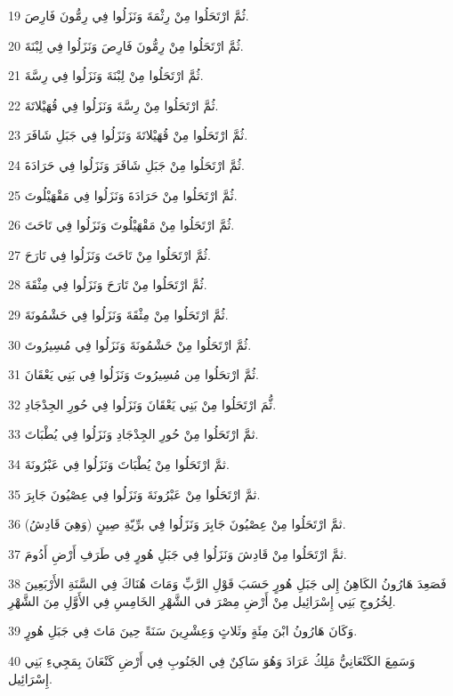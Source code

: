 \par 19 ثُمَّ ارْتَحَلُوا مِنْ رِثْمَةَ وَنَزَلُوا فِي رِمُّونَ فَارِصَ.
\par 20 ثُمَّ ارْتَحَلُوا مِنْ رِمُّونَ فَارِصَ وَنَزَلُوا فِي لِبْنَةَ.
\par 21 ثُمَّ ارْتَحَلُوا مِنْ لِبْنَةَ وَنَزَلُوا فِي رِسَّةَ.
\par 22 ثُمَّ ارْتَحَلُوا مِنْ رِسَّةَ وَنَزَلُوا فِي قُهَيْلاتَةَ.
\par 23 ثُمَّ ارْتَحَلُوا مِنْ قُهَيْلاتَةَ وَنَزَلُوا فِي جَبَلِ شَافَرَ.
\par 24 ثُمَّ ارْتَحَلُوا مِنْ جَبَلِ شَافَرَ وَنَزَلُوا فِي حَرَادَةَ.
\par 25 ثُمَّ ارْتَحَلُوا مِنْ حَرَادَةَ وَنَزَلُوا فِي مَقْهَيْلُوتَ.
\par 26 ثُمَّ ارْتَحَلُوا مِنْ مَقْهَيْلُوتَ وَنَزَلُوا فِي تَاحَتَ.
\par 27 ثُمَّ ارْتَحَلُوا مِنْ تَاحَتَ وَنَزَلُوا فِي تَارَحَ.
\par 28 ثُمَّ ارْتَحَلُوا مِنْ تَارَحَ وَنَزَلُوا فِي مِثْقَةَ.
\par 29 ثُمَّ ارْتَحَلُوا مِنْ مِثْقَةَ وَنَزَلُوا فِي حَشْمُونَةَ.
\par 30 ثُمَّ ارْتَحَلُوا مِنْ حَشْمُونَةَ وَنَزَلُوا فِي مُسِيرُوتَ.
\par 31 ثُمَّ ارْتحَلُوا مِن مُسِيرُوتَ وَنَزَلُوا فِي بَنِي يَعْقَانَ.
\par 32 ثُّمَ ارْتَحَلُوا مِنْ بَنِي يَعْقَانَ وَنَزَلُوا فِي حُورِ الجِدْجَادِ.
\par 33 ثمَّ ارْتَحَلُوا مِنْ حُورِ الجِدْجَادِ وَنَزَلُوا فِي يُطْبَاتَ.
\par 34 ثمَّ ارْتَحَلُوا مِنْ يُطْبَاتَ وَنَزَلُوا فِي عَبْرُونَةَ.
\par 35 ثمَّ ارْتَحَلُوا مِنْ عَبْرُونَةَ وَنَزَلُوا فِي عِصْيُونَ جَابِرَ.
\par 36 ثمَّ ارْتَحَلُوا مِنْ عِصْيُونَ جَابِرَ وَنَزَلُوا فِي برِّيّةِ صِينٍ (وَهِيَ قَادِشُ).
\par 37 ثمَّ ارْتَحَلُوا مِنْ قَادِشَ وَنَزَلُوا فِي جَبَلِ هُورٍ فِي طَرَفِ أَرْضِ أَدُومَ.
\par 38 فَصَعِدَ هَارُونُ الكَاهِنُ إِلى جَبَلِ هُورٍ حَسَبَ قَوْلِ الرَّبِّ وَمَاتَ هُنَاكَ فِي السَّنَةِ الأَرْبَعِينَ لِخُرُوجِ بَنِي إِسْرَائِيل مِنْ أَرْضِ مِصْرَ في الشَّهْرِ الخَامِسِ فِي الأَوَّلِ مِنَ الشَّهْرِ.
\par 39 وَكَانَ هَارُونُ ابْنَ مِئَةٍ وثَلاثٍ وَعِشْرِينَ سَنَةً حِينَ مَاتَ فِي جَبَلِ هُورٍ.
\par 40 وَسَمِعَ الكَنْعَانِيُّ مَلِكُ عَرَادَ وَهُوَ سَاكِنٌ فِي الجَنُوبِ فِي أَرْضِ كَنْعَانَ بِمَجِيءِ بَنِي إِسْرَائِيل.
